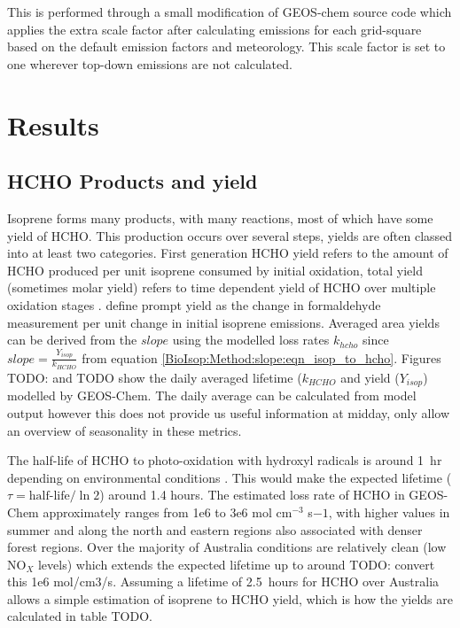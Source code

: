   This is performed through a small modification of GEOS-chem source code which applies the extra scale factor after calculating emissions for each grid-square based on the default emission factors and meteorology.
  This scale factor is set to one wherever top-down emissions are not calculated.

\section{Results}
  \label{BioIsop:Results}
  
  
  
  \subsection{HCHO Products and yield}
    \label{BioIsop:Results:HCHOYield}
    Isoprene forms many products, with many reactions, most of which have some yield of HCHO.
    This production occurs over several steps, yields are often classed into at least two categories.
    First generation HCHO yield refers to the amount of HCHO produced per unit isoprene consumed by initial oxidation, total yield (sometimes molar yield) refers to time dependent yield of HCHO over multiple oxidation stages \parencite{Wolfe2016}.
    \textcite{Wolfe2016} define prompt yield as the change in formaldehyde measurement per unit change in initial isoprene emissions.
    Averaged area yields can be derived from the $slope$ using the modelled loss rates $k_{hcho}$ since $slope = \frac{Y_{isop}}{k_{HCHO}}$ from equation \ref{BioIsop:Method:slope:eqn_isop_to_hcho}.
    Figures TODO: and TODO show the daily averaged lifetime ($k_{HCHO}$ and yield ($Y_{isop}$) modelled by GEOS-Chem.
    The daily average can be calculated from model output however this does not provide us useful information at midday, only allow an overview of seasonality in these metrics.
    
    The half-life of HCHO to photo-oxidation with hydroxyl radicals is around 1~hr depending on environmental conditions \parencite{WHO_hcho_guidelines_2010}.
    This would make the expected lifetime ($\tau = \text{half-life}/\ln{2}$) around 1.4 hours.
    The estimated loss rate of HCHO in GEOS-Chem approximately ranges from 1e6 to 3e6 mol cm$^{-3}$ s${-1}$, with higher values in summer and along the north and eastern regions also associated with denser forest regions.
    Over the majority of Australia conditions are relatively clean (low NO$_X$ levels) which extends the expected lifetime up to around TODO: convert this  1e6 mol/cm3/s.
    Assuming a lifetime of 2.5~hours for HCHO over Australia allows a simple estimation of isoprene to HCHO yield, which is how the yields are calculated in table TODO.
    
